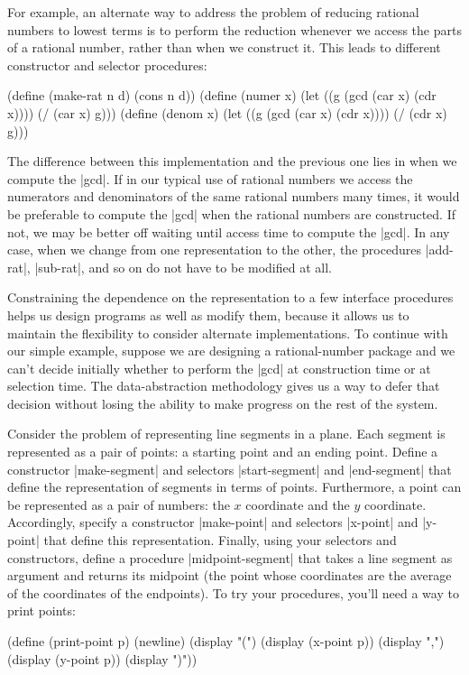 For example, an alternate way to address the problem of reducing rational
numbers to lowest terms is to perform the reduction whenever we
access the parts of a rational number, rather than when we construct
it.  This leads to different constructor and selector procedures:

\begin{schemedisplay}
(define (make-rat n d)
  (cons n d))
(define (numer x)
  (let ((g (gcd (car x) (cdr x))))
    (/ (car x) g)))
(define (denom x)
  (let ((g (gcd (car x) (cdr x))))
    (/ (cdr x) g)))
\end{schemedisplay}
The difference between this implementation and the previous one lies
in when we compute the \scheme|gcd|.  If in our typical use of
rational numbers we access the numerators and denominators of the same
rational numbers many times, it would be preferable to compute the
\scheme|gcd| when the rational numbers are constructed.  If not, we
may be better off waiting until access time to compute the
\scheme|gcd|.  In any case, when we change from one representation to
the other, the procedures \scheme|add-rat|, \scheme|sub-rat|, and so
on do not have to be modified at all.


Constraining the dependence on the representation to a few interface
procedures helps us design programs as well as modify them, because it
allows us to maintain the flexibility to consider alternate
implementations.  To continue with our simple example, suppose we are
designing a rational-number package and we can't decide initially
whether to perform the \scheme|gcd| at construction time or at
selection time.  The data-abstraction methodology gives us a way to
defer that decision without losing the ability to make progress on the
rest of the system.

\begin{Exercise}
\label{exc:2.2}
Consider the problem of representing line segments in a plane.  Each
segment is represented as a pair of points: a starting point and an
ending point.  Define a constructor \scheme|make-segment| and
selectors \scheme|start-segment| and \scheme|end-segment| that define
the representation of segments in terms of points.  Furthermore, a
point can be represented as a pair of numbers: the $x$ coordinate and
the $y$ coordinate.  Accordingly, specify a constructor
\scheme|make-point| and selectors \scheme|x-point| and
\scheme|y-point| that define this representation.  Finally, using your
selectors and constructors, define a procedure
\scheme|midpoint-segment| that takes a line segment as argument and
returns its midpoint (the point whose coordinates are the average of
the coordinates of the endpoints).  To try your procedures, you'll
need a way to print points:

\begin{schemedisplay}
(define (print-point p)
  (newline)
  (display "(")
  (display (x-point p))
  (display ",")
  (display (y-point p))
  (display ")"))
\end{schemedisplay}
\end{Exercise}

